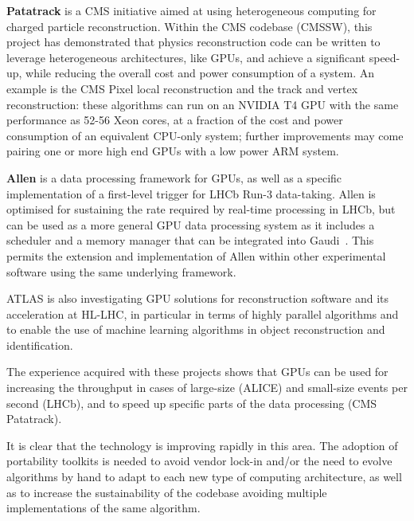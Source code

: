 \textbf{Patatrack} is a CMS initiative aimed at using heterogeneous
computing for charged particle reconstruction. Within the CMS
codebase (CMSSW), this project has demonstrated that physics
reconstruction code can be written to leverage heterogeneous
architectures, like GPUs, and achieve a significant speed-up, while
reducing the overall cost and power consumption of a system. An example
is the CMS Pixel local reconstruction and the track and vertex
reconstruction: these algorithms can run on an NVIDIA T4 GPU with the
same performance as 52-56 Xeon cores, at a fraction of the cost and
power consumption of an equivalent CPU-only system; further improvements
may come pairing one or more high end GPUs with a low power ARM system.

\textbf{Allen} is a data processing framework for GPUs, as well as a
specific implementation of a first-level trigger for LHCb Run-3
data-taking. Allen is optimised for sustaining the rate required by
real-time processing in LHCb, but can be used as a more general GPU data
processing system as it includes a scheduler and a memory manager that can be
integrated into Gaudi~\cite{gaudi_paper}. This permits the extension and implementation of
Allen within other experimental software using the same underlying
framework.

ATLAS is also investigating GPU solutions for reconstruction software
and its acceleration at HL-LHC, in particular in terms of highly
parallel algorithms \cite{attila_krasznahorkay_2019_3599103} and to enable the use of machine learning
algorithms in object reconstruction and identification. %

The experience acquired with these projects shows that GPUs can be used
for increasing the throughput in cases of large-size (ALICE)
\cite{david_rohr_2019_3599418} and small-size events per second (LHCb), and to speed up
specific parts of the data processing (CMS Patatrack).

It is clear that the technology is improving rapidly in this area. The
adoption of portability toolkits is needed to avoid vendor lock-in
and/or the need to evolve algorithms by hand to adapt to each new type
of computing architecture, as well as to increase the sustainability of
the codebase avoiding multiple implementations of the same algorithm.


